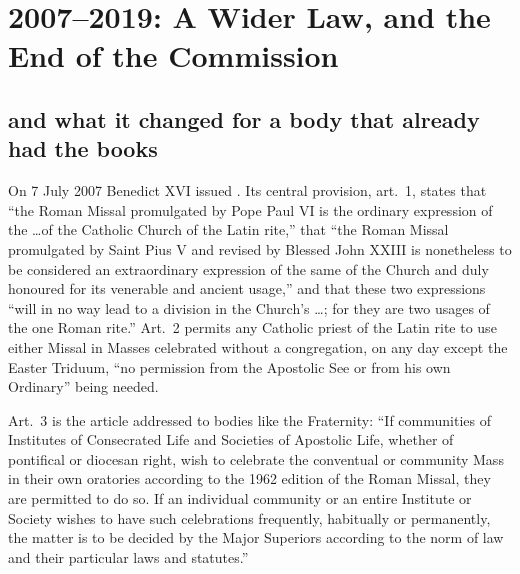 \section{2007--2019: A Wider Law, and the End of the Commission}

\subsection{ and what it changed for a body that already had the books}

On 7 July 2007 Benedict XVI issued . Its
central provision, art.~1, states that ``the Roman Missal promulgated by
Pope Paul VI is the ordinary expression of the  \ldots of
the Catholic Church of the Latin rite,'' that ``the Roman Missal
promulgated by Saint Pius V and revised by Blessed John XXIII is
nonetheless to be considered an extraordinary expression of the same
 of the Church and duly honoured for its venerable and
ancient usage,'' and that these two expressions ``will in no way lead to a
division in the Church's  \ldots; for they are two
usages of the one Roman rite.'' Art.~2 permits any Catholic priest of the
Latin rite to use either Missal in Masses celebrated without a
congregation, on any day except the Easter Triduum, ``no permission from
the Apostolic See or from his own Ordinary'' being needed.

Art.~3 is the article addressed to bodies like the Fraternity: ``If
communities of Institutes of Consecrated Life and Societies of Apostolic
Life, whether of pontifical or diocesan right, wish to celebrate the
conventual or community Mass in their own oratories according to the 1962
edition of the Roman Missal, they are permitted to do so. If an individual
community or an entire Institute or Society wishes to have such
celebrations frequently, habitually or permanently, the matter is to be
decided by the Major Superiors according to the norm of law and their
particular laws and statutes.''

